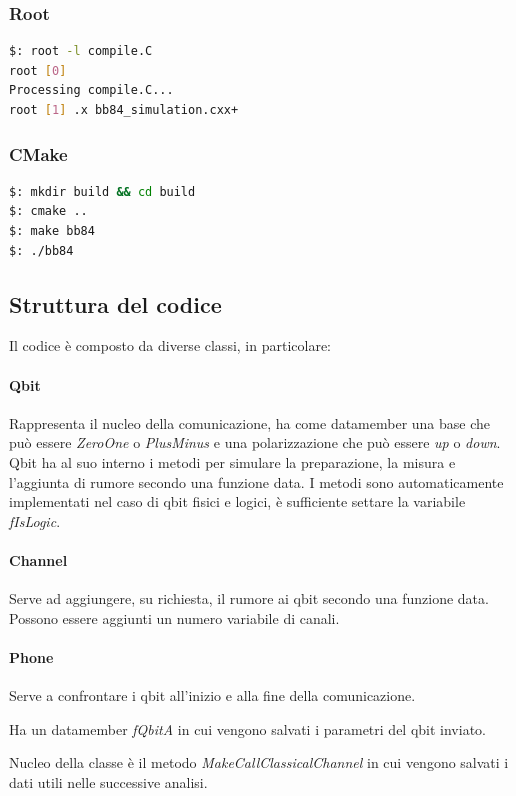 \documentclass[11 pt, a4paper]{article}
\begin{document}
\subsubsection{Root}
\begin{lstlisting}[language=bash, style=myRoot]
$: root -l compile.C
root [0] 
Processing compile.C...
root [1] .x bb84_simulation.cxx+
\end{lstlisting}

\subsubsection{CMake}
\begin{lstlisting}[language=bash]
$: mkdir build && cd build
$: cmake ..
$: make bb84
$: ./bb84
\end{lstlisting}

\subsection{Struttura del codice}
Il codice è composto da diverse classi, in particolare:
\paragraph{Qbit}
Rappresenta il nucleo della comunicazione, ha come datamember una base che può essere \textit{ZeroOne} o \textit{PlusMinus} e una polarizzazione che può essere \textit{up} o \textit{down}.
Qbit ha al suo interno i metodi per simulare la  preparazione, la misura e l'aggiunta di rumore secondo una funzione data.
I metodi sono automaticamente implementati nel caso di qbit fisici e logici, è sufficiente settare la variabile \textit{fIsLogic}.

\paragraph{Channel}
Serve ad aggiungere, su richiesta, il rumore ai qbit secondo una funzione data.
Possono essere aggiunti un numero variabile di canali.

\paragraph{Phone}
Serve a confrontare i qbit all'inizio e alla fine della comunicazione.

Ha un datamember \textit{fQbitA} in cui vengono salvati i parametri del qbit inviato.

Nucleo della classe è il metodo \textit{MakeCallClassicalChannel} in cui vengono salvati i dati utili nelle successive analisi.
\end{document}
